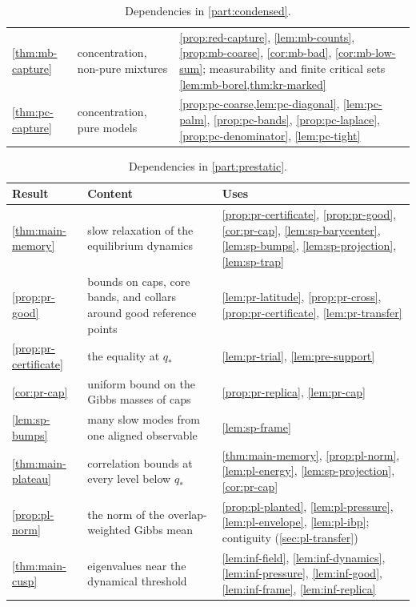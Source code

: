 \begin{table}[ht]
\begin{tabular}{@{}>{\raggedright\arraybackslash}p{}>{\raggedright\arraybackslash}p{}>{\raggedright\arraybackslash}p{}@{}}
\cref{thm:mb-capture} & concentration, non-pure mixtures & \cref{prop:red-capture}, \cref{lem:mb-counts}, \cref{prop:mb-coarse}, \cref{cor:mb-bad}, \cref{cor:mb-low-sum}; measurability and finite critical sets \cref{lem:mb-borel,thm:kr-marked}\\
\cref{thm:pc-capture} & concentration, pure models & \cref{prop:pc-coarse,lem:pc-diagonal}, \cref{lem:pc-palm}, \cref{prop:pc-bands}, \cref{prop:pc-laplace}, \cref{prop:pc-denominator}, \cref{lem:pc-tight}\\
\bottomrule
\end{tabular}
\caption{Dependencies in \cref{part:condensed}.}
\label{tab:ov-condensed}
\end{table}

\begin{table}[ht]
\centering
\small
\begin{tabular}{@{}>{\raggedright\arraybackslash}p{}>{\raggedright\arraybackslash}p{}>{\raggedright\arraybackslash}p{}@{}}
\toprule
Result & Content & Uses\\
\midrule
\cref{thm:main-memory} & slow relaxation of the equilibrium dynamics & \cref{prop:pr-certificate}, \cref{prop:pr-good}, \cref{cor:pr-cap}, \cref{lem:sp-barycenter}, \cref{lem:sp-bumps}, \cref{lem:sp-projection}, \cref{lem:sp-trap}\\
\cref{prop:pr-good} & bounds on caps, core bands, and collars around good reference points & \cref{lem:pr-latitude}, \cref{prop:pr-cross}, \cref{prop:pr-certificate}, \cref{lem:pr-transfer}\\
\cref{prop:pr-certificate} & the equality at $q_*$ & \cref{lem:pr-trial}, \cref{lem:pre-support}\\
\cref{cor:pr-cap} & uniform bound on the Gibbs masses of caps & \cref{prop:pr-replica}, \cref{lem:pr-cap}\\
\cref{lem:sp-bumps} & many slow modes from one aligned observable & \cref{lem:sp-frame}\\
\cref{thm:main-plateau} & correlation bounds at every level below $q_*$ & \cref{thm:main-memory}, \cref{prop:pl-norm}, \cref{lem:pl-energy}, \cref{lem:sp-projection}, \cref{cor:pr-cap}\\
\cref{prop:pl-norm} & the norm of the overlap-weighted Gibbs mean & \cref{prop:pl-planted}, \cref{lem:pl-pressure}, \cref{lem:pl-envelope}, \cref{lem:pl-ibp}; contiguity (\cref{sec:pl-transfer})\\
\cref{thm:main-cusp} & eigenvalues near the dynamical threshold & \cref{lem:inf-field}, \cref{lem:inf-dynamics}, \cref{lem:inf-pressure}, \cref{lem:inf-good}, \cref{lem:inf-frame}, \cref{lem:inf-replica}\\
\bottomrule
\end{tabular}
\caption{Dependencies in \cref{part:prestatic}.}
\label{tab:ov-prestatic}
\end{table}

